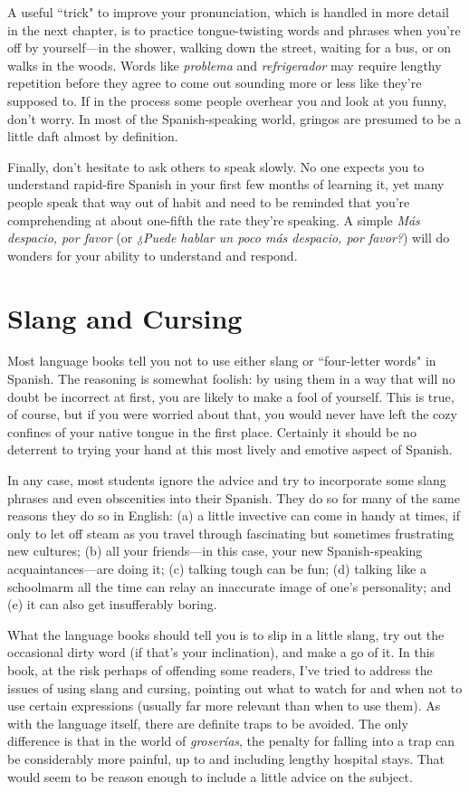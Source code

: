 A useful ``trick" to improve your pronunciation, which is
handled in more detail in the next chapter, is to practice tongue-twisting words and phrases when you're off by yourself---in the
shower, walking down the street, waiting for a bus, or on walks in the
woods. Words like \emph{problema} and \emph{refrigerador} may require lengthy
repetition before they agree to come out sounding more or less like
they're supposed to. If in the process some people overhear you and
look at you funny, don't worry. In most of the Spanish-speaking world,
gringos are presumed to be a little daft almost by definition.

Finally, don't hesitate to ask others to speak slowly. No one
expects you to understand rapid-fire Spanish in your first few months
of learning it, yet many people speak that way out of habit and need to
be reminded that you're comprehending at about one-fifth the rate
they're speaking. A simple \emph{Más despacio, por favor} (or \emph{¿Puede hablar
	un poco más despacio, por favor?}) will do wonders for your ability to
understand and respond.

\section{Slang and Cursing}

Most language books tell you not to use either slang or ``four-letter words" in Spanish. The reasoning is somewhat foolish: by using
them in a way that will no doubt be incorrect at first, you are likely to
make a fool of yourself. This is true, of course, but if you were worried
about that, you would never have left the cozy confines of your native
tongue in the first place. Certainly it should be no deterrent to trying
your hand at this most lively and emotive aspect of Spanish.

In any case, most students ignore the advice and try to incorporate some slang phrases and even obscenities into their Spanish.
They do so for many of the same reasons they do so in English: (a) a
little invective can come in handy at times, if only to let off steam as
you travel through fascinating but sometimes frustrating new cultures;
(b) all your friends---in this case, your new Spanish-speaking acquaintances---are doing it; (c) talking tough can be fun; (d) talking like a
schoolmarm all the time can relay an inaccurate image of one's personality; and (e) it can also get insufferably boring.

What the language books should tell you is to slip in a little
slang, try out the occasional dirty word (if that's your inclination), and
make a go of it. In this book, at the risk perhaps of offending some
readers, I've tried to address the issues of using slang and cursing,
pointing out what to watch for and when not to use certain expressions (usually far more relevant than when to use them). As with the
language itself, there are definite traps to be avoided. The only difference is that in the world of \emph{groserías}, the penalty for falling into a trap
can be considerably more painful, up to and including lengthy hospital
stays. That would seem to be reason enough to include a little advice
on the subject.

